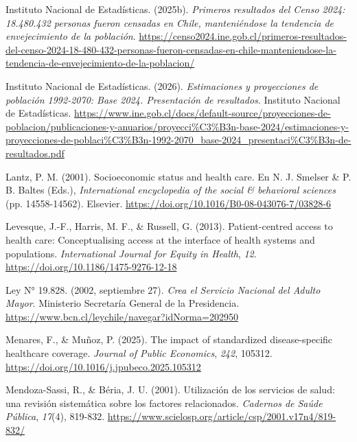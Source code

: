 \documentclass[
  spanish,
  a4paper,
  oneside]{scrbook}
\newlength{\cslhangindent}
\newenvironment{CSLReferences}[2] %
 {\begin{list}{}{%
  \setlength{\itemindent}{0pt}
  \setlength{\leftmargin}{0pt}
  \setlength{\parsep}{0pt}
  \ifodd #1
   \setlength{\leftmargin}{\cslhangindent}
   \setlength{\itemindent}{-1\cslhangindent}
  \fi
  \setlength{\itemsep}{#2\baselineskip}}}
 {\end{list}}
\begin{document}
\begin{CSLReferences}{1}{0}
Instituto Nacional de Estadísticas. (2025b). \emph{Primeros resultados
del Censo 2024: 18.480.432 personas fueron censadas en Chile,
manteniéndose la tendencia de envejecimiento de la población}.
\url{https://censo2024.ine.gob.cl/primeros-resultados-del-censo-2024-18-480-432-personas-fueron-censadas-en-chile-manteniendose-la-tendencia-de-envejecimiento-de-la-poblacion/}

Instituto Nacional de Estadísticas. (2026). \emph{Estimaciones y
proyecciones de población 1992-2070: Base 2024. Presentación de
resultados}. Instituto Nacional de Estadísticas.
\url{https://www.ine.gob.cl/docs/default-source/proyecciones-de-poblacion/publicaciones-y-anuarios/proyecci\%C3\%B3n-base-2024/estimaciones-y-proyecciones-de-poblaci\%C3\%B3n-1992-2070_base-2024_presentaci\%C3\%B3n-de-resultados.pdf}

Lantz, P. M. (2001). Socioeconomic status and health care. En N. J.
Smelser \& P. B. Baltes (Eds.), \emph{International encyclopedia of the
social \& behavioral sciences} (pp. 14558-14562). Elsevier.
\url{https://doi.org/10.1016/B0-08-043076-7/03828-6}

Levesque, J.-F., Harris, M. F., \& Russell, G. (2013). Patient-centred
access to health care: {Conceptualising} access at the interface of
health systems and populations. \emph{International Journal for Equity
in Health}, \emph{12}. \url{https://doi.org/10.1186/1475-9276-12-18}

Ley N° 19.828. (2002, septiembre 27). \emph{Crea el Servicio Nacional
del Adulto Mayor}. Ministerio Secretaría General de la Presidencia.
\url{https://www.bcn.cl/leychile/navegar?idNorma=202950}

Menares, F., \& Muñoz, P. (2025). The impact of standardized
disease-specific healthcare coverage. \emph{Journal of Public
Economics}, \emph{242}, 105312.
\url{https://doi.org/10.1016/j.jpubeco.2025.105312}

Mendoza-Sassi, R., \& Béria, J. U. (2001). Utilización de los servicios
de salud: una revisión sistemática sobre los factores relacionados.
\emph{Cadernos de Saúde Pública}, \emph{17}(4), 819-832.
\url{https://www.scielosp.org/article/csp/2001.v17n4/819-832/}


\end{CSLReferences}
\end{document}
